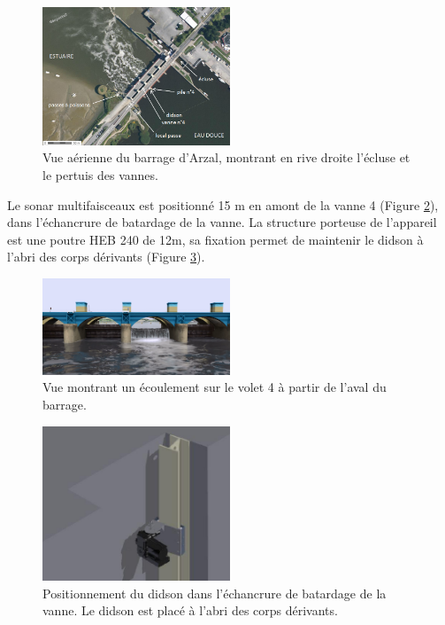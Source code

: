 \documentclass[11pt,twocolumn,titlepage,twoside]{article}
\begin{document}
\begin{figure}[htbp]
\centering
\includegraphics[width=0.5\textwidth]{vueaeriennebarrage.png}
\caption[Vue aérienne du barrage d'Arzal]{Vue aérienne du barrage d'Arzal,
montrant en rive droite l'écluse et le pertuis des vannes.}
\label{vueaeriennebarrage}
\end{figure}

Le sonar multifaisceaux est positionné 15 m en amont de la
vanne 4 (Figure \ref{arzal_aval}), dans l'échancrure de batardage de
la vanne.  La structure porteuse de l'appareil est une poutre HEB 240 de 12m, sa fixation permet de maintenir le didson à l'abri des corps
dérivants (Figure \ref{positionnementdidson}).

\begin{figure}[htbp]
\centering
\includegraphics[width=0.5\textwidth]{arzal_aval}
\caption[Vue aval du volet]{Vue montrant un écoulement sur le volet 4 à
partir de l'aval du barrage.}
\label{arzal_aval}
\end{figure}


\begin{figure}[hbp]
\centering
\includegraphics[width=0.5\textwidth]{positionnementdidson.png}
\caption[Positionnement du didson]{Positionnement du didson dans l'échancrure
de batardage de la vanne. Le didson est placé à l'abri des corps dérivants.}
\label{positionnementdidson}
\end{figure}
\end{document}
